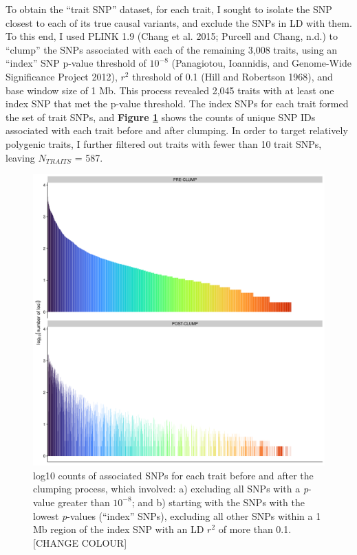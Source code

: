 \documentclass[
]{book}
\begin{document}
To obtain the ``trait SNP'' dataset, for each trait, I sought to isolate the SNP closest to each of its true causal variants, and exclude the SNPs in LD with them. To this end, I used PLINK 1.9 (Chang et al. 2015; Purcell and Chang, n.d.) to ``clump'' the SNPs associated with each of the remaining 3,008 traits, using an ``index'' SNP p-value threshold of \(10^{-8}\) (Panagiotou, Ioannidis, and Genome-Wide Significance Project 2012), \(r^2\) threshold of 0.1 (Hill and Robertson 1968), and base window size of 1 Mb. This process revealed 2,045 traits with at least one index SNP that met the p-value threshold. The index SNPs for each trait formed the set of trait SNPs, and \textbf{Figure \ref{fig:FstSnpCount}} shows the counts of unique SNP IDs associated with each trait before and after clumping. In order to target relatively polygenic traits, I further filtered out traits with fewer than 10 trait SNPs, leaving \(N_{TRAITS}\) = 587.



\begin{figure}
\includegraphics[width=1\linewidth]{figs/fst/0.1_1000_20220314_snp_counts} \caption{log10 counts of associated SNPs for each trait before and after the clumping process, which involved: a) excluding all SNPs with a \emph{p}-value greater than \(10^{-8}\); and b) starting with the SNPs with the lowest \emph{p}-values (``index'' SNPs), excluding all other SNPs within a 1 Mb region of the index SNP with an LD \(r^2\) of more than 0.1. {[}CHANGE COLOUR{]}}\label{fig:FstSnpCount}
\end{figure}
\end{document}

